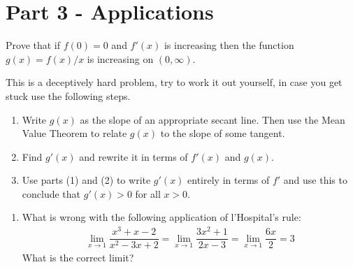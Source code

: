 \documentclass[9pt, a4paper, oneside]{amsart}
\begin{document}
\newpage
\section*{Part 3 - Applications}

\begin{questions}[resume]



	\item Prove that if $ f(0) = 0$ and $ f'(x)$ is increasing then the function $ g(x) = f(x) / x$ is increasing on $ (0,\infty)$.

	This is a deceptively hard problem, try to work it out yourself, in case you get stuck use the following steps.
	\begin{enumerate}
		\item Write $ g(x)$ as the slope of an appropriate secant line. Then use the Mean Value Theorem to relate $ g(x)$ to the slope of some tangent.
		\item Find $ g'(x)$ and rewrite it in terms of $ f'(x) $ and $ g(x)$.
		\item Use parts (1)	 and (2)	to write $ g'(x)$ entirely in terms of $ f'$ and use this to conclude that $ g'(x) > 0$ for all $ x > 0$.
	\end{enumerate}

	\item
	\begin{enumerate}
		\item What is wrong with the following application of l'Hospital's rule:
		      \begin{align*}
		      	\lim \limits_{x \rightarrow 1} \dfrac{x^3 + x - 2}{x^2 - 3x + 2} 
		      	=
		      	\lim \limits_{x \rightarrow 1} \dfrac{3x^2 + 1}{2x - 3}
		      	=
		      	\lim \limits_{x \rightarrow 1} \dfrac{6x}{2}
		      	=
		      	3
		      \end{align*}
		      What is the correct limit?


\end{enumerate}
\end{questions}
\end{document}
